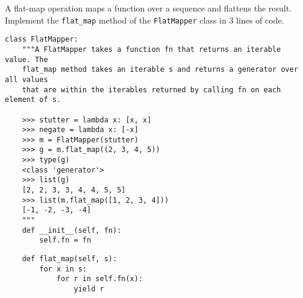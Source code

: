 \begin{blocksection}
\question A flat-map operation maps a function over a sequence and flattens the result. Implement the \lstinline$flat_map$ method of the \lstinline$FlatMapper$ class in 3 lines of code.

\begin{lstlisting}
class FlatMapper:
    """A FlatMapper takes a function fn that returns an iterable value. The
    flat_map method takes an iterable s and returns a generator over all values
    that are within the iterables returned by calling fn on each element of s.

    >>> stutter = lambda x: [x, x]
    >>> negate = lambda x: [-x]
    >>> m = FlatMapper(stutter)
    >>> g = m.flat_map((2, 3, 4, 5))
    >>> type(g)
    <class 'generator'>
    >>> list(g)
    [2, 2, 3, 3, 4, 4, 5, 5]
    >>> list(m.flat_map([1, 2, 3, 4]))
    [-1, -2, -3, -4]
    """
    def __init__(self, fn):
        self.fn = fn
\end{lstlisting}

\begin{solution}[1in]
\begin{lstlisting}
    def flat_map(self, s):
        for x in s:
            for r in self.fn(x):
                yield r
\end{lstlisting}
\end{solution}

\end{blocksection}
